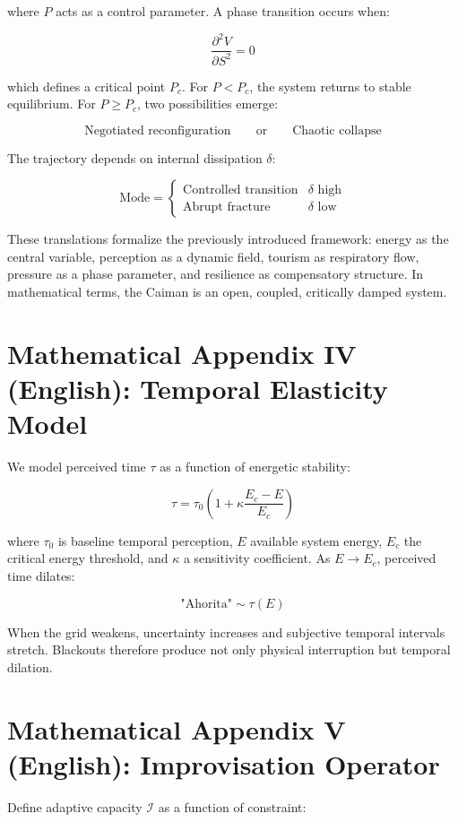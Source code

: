 \documentclass[12pt]{article}
\begin{document}
where \( P \) acts as a control parameter. A phase transition occurs when:

\[
\frac{\partial^2 V}{\partial S^2} = 0
\]

which defines a critical point \( P_c \). For \( P < P_c \), the system returns to stable equilibrium. For \( P \ge P_c \), two possibilities emerge:

\[
\text{Negotiated reconfiguration} \qquad \text{or} \qquad \text{Chaotic collapse}
\]

The trajectory depends on internal dissipation \( \delta \):

\[
\text{Mode} =
\begin{cases}
\text{Controlled transition} & \delta \text{ high} \\
\text{Abrupt fracture} & \delta \text{ low}
\end{cases}
\]

These translations formalize the previously introduced framework: energy as the central variable, perception as a dynamic field, tourism as respiratory flow, pressure as a phase parameter, and resilience as compensatory structure. In mathematical terms, the Caiman is an open, coupled, critically damped system.

\section{Mathematical Appendix IV (English): Temporal Elasticity Model}

We model perceived time \( \tau \) as a function of energetic stability:

\[
\tau = \tau_0 \left(1 + \kappa \frac{E_c - E}{E_c}\right)
\]

where \( \tau_0 \) is baseline temporal perception, \( E \) available system energy, \( E_c \) the critical energy threshold, and \( \kappa \) a sensitivity coefficient. As \( E \to E_c \), perceived time dilates:

\[
\text{"Ahorita"} \sim \tau(E)
\]

When the grid weakens, uncertainty increases and subjective temporal intervals stretch. Blackouts therefore produce not only physical interruption but temporal dilation.

\section{Mathematical Appendix V (English): Improvisation Operator}

Define adaptive capacity \( \mathcal{I} \) as a function of constraint:
\end{document}
